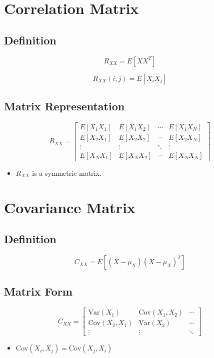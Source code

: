 \documentclass[11pt]{article}
\begin{document}
\section{Correlation Matrix}

\subsection{Definition}
\[
R_{XX} = E[XX^T]
\]

\[
R_{XX}(i,j) = E[X_i X_j]
\]

\subsection{Matrix Representation}
\[
R_{XX} =
\begin{bmatrix}
E[X_1 X_1] & E[X_1 X_2] & \cdots & E[X_1 X_N] \\
E[X_2 X_1] & E[X_2 X_2] & \cdots & E[X_2 X_N] \\
\vdots & \vdots & \ddots & \vdots \\
E[X_N X_1] & E[X_N X_2] & \cdots & E[X_N X_N]
\end{bmatrix}
\]

\begin{itemize}
\item $R_{XX}$ is a symmetric matrix.
\end{itemize}

\section{Covariance Matrix}

\subsection{Definition}
\[
C_{XX} = E[(X - \mu_X)(X - \mu_X)^T]
\]

\subsection{Matrix Form}
\[
C_{XX} =
\begin{bmatrix}
\text{Var}(X_1) & \text{Cov}(X_1, X_2) & \cdots \\
\text{Cov}(X_2, X_1) & \text{Var}(X_2) & \cdots \\
\vdots & \vdots & \ddots
\end{bmatrix}
\]

\begin{itemize}
\item $\text{Cov}(X_i, X_j) = \text{Cov}(X_j, X_i)$
\end{itemize}
\end{document}
